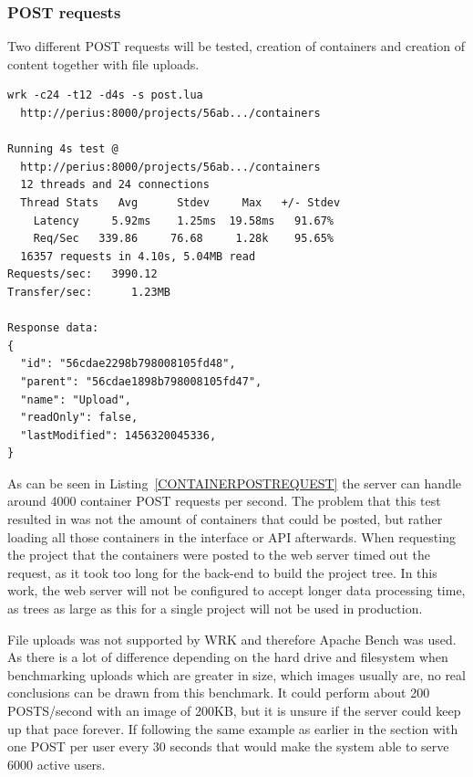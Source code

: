 \documentclass[a4paper,12pt]{article}
\begin{document}
\subsubsection{POST requests}
Two different POST requests will be tested, creation of containers and creation of content together
with file uploads. 

\begin{minipage}{\linewidth-1cm}
\begin{lstlisting}[label=CONTAINERPOSTREQUEST,caption=Result of container creation]
wrk -c24 -t12 -d4s -s post.lua 
  http://perius:8000/projects/56ab.../containers 
  
Running 4s test @ 
  http://perius:8000/projects/56ab.../containers
  12 threads and 24 connections
  Thread Stats   Avg      Stdev     Max   +/- Stdev
    Latency     5.92ms    1.25ms  19.58ms   91.67%
    Req/Sec   339.86     76.68     1.28k    95.65%
  16357 requests in 4.10s, 5.04MB read
Requests/sec:   3990.12
Transfer/sec:      1.23MB

Response data:
{
  "id": "56cdae2298b798008105fd48",
  "parent": "56cdae1898b798008105fd47",
  "name": "Upload",
  "readOnly": false,
  "lastModified": 1456320045336,
}
\end{lstlisting}
\end{minipage}

As can be seen in Listing~\ref{CONTAINERPOSTREQUEST} the server can handle around 4000 container
POST requests per second. The problem that this test resulted in was not the amount of containers
that could be posted, but rather loading all those containers in the interface or API afterwards.
When requesting the project that the containers were posted to the web server timed out the request,
as it took too long for the back-end to build the project tree. In this work, the web server will
not  
be configured to accept longer data processing time, as trees as large as this for a single project
will not be used in production.

\par
File uploads was not supported by WRK and therefore Apache Bench was used. As there is a lot of
difference depending on the hard drive and filesystem when benchmarking uploads which are greater in
size, which images usually are, no real conclusions can be drawn from this benchmark. It could
perform about 200 POSTS/second with an image of 200KB, but it is unsure if the server could keep up
that pace forever. If following the same example as earlier in the section with one POST per user
every 30 seconds that would make the system able to serve 6000 active users.
\end{document}
